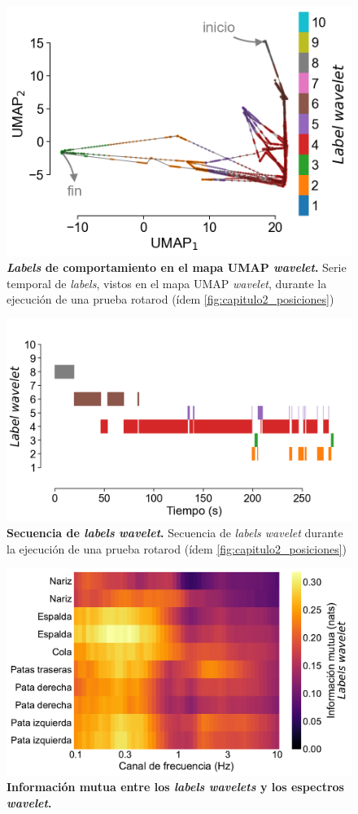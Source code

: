 \begin{appendix}
    \begin{figure}[htbp]
        \centering
        \includegraphics[width=0.7\linewidth]{figuras/capitulo4/label_serie_mapa_wav.png}
        \caption{\textbf{\textit{Labels} de comportamiento en el mapa UMAP \textit{wavelet}.}
            Serie temporal de \textit{labels}, vistos en el mapa UMAP \textit{wavelet}, durante la ejecución de una prueba rotarod (ídem \autoref{fig:capitulo2_posiciones})}
        \label{fig:capitulo4_label_serie_mapa_wav}
    \end{figure}

    \begin{figure}[htbp]
        \centering
        \includegraphics[width=0.7\linewidth]{figuras/capitulo4/label_secuencia_wav.png}
        \caption{\textbf{Secuencia de \textit{labels} \textit{wavelet}.}
            Secuencia de \textit{labels wavelet} durante la ejecución de una prueba rotarod (ídem \autoref{fig:capitulo2_posiciones})}
        \label{fig:capitulo4_label_secuencia_wav}
    \end{figure}

    \begin{figure}[htbp]
        \centering
        \includegraphics[width=0.7\linewidth]{figuras/capitulo4/mi_labels_wav.pdf}
        \caption{\textbf{Información mutua entre los \textit{labels} \textit{wavelets} y los espectros \textit{wavelet}.}}
        \label{fig:capitulo4_mi_labels_wav}
    \end{figure}


\end{appendix}
